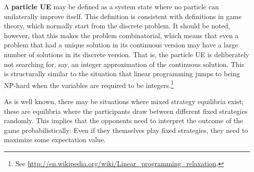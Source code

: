 A \textbf{particle UE} may be defined as a system state where no
particle can unilaterally improve itself. 
%
This definition is consistent with definitions in game theory, which
normally start from the discrete problem.
%
It should be noted, however, that this makes the problem
combinatorial, which means that even a problem that had a unique
solution in its continuous version may have a large number of
solutions in its discrete version.  That is, the particle UE is
deliberately not searching for, say, an integer approximation of the
continuous solution.
%
This is structurally similar to the situation that linear programming
jumps to being NP-hard when the variables are required to be
integers.\footnote{%
%
See \url{http://en.wikipedia.org/wiki/Linear_programming_relaxation}.
%
}

As is well known, there may be situations where mixed strategy
equilibria exist; these are equilibria where the participants draw
between different fixed strategies randomly.  This implies that the
opponents need to interpret the outcome of the game probabilistically:
Even if they themselves play fixed strategies, they need to maximize
some expectation value.


